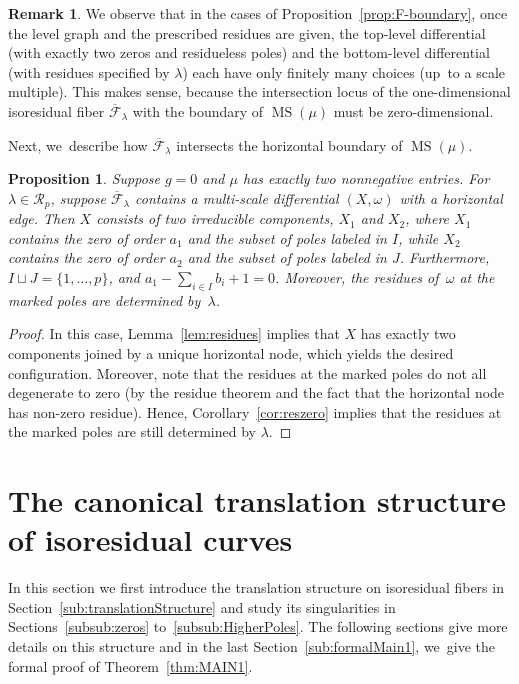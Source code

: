 \documentclass[11pt]{article}
\DeclareMathOperator\MS{MS}
\newtheorem{prop}[thm]{Proposition}
\theoremstyle{definition}
\newtheorem{rmk}[thm]{Remark}
\begin{document}
\begin{rmk}
We observe that in the cases of Proposition~\ref{prop:F-boundary}, once the level graph and the prescribed residues are given, the top-level differential (with exactly two zeros and residueless poles) and the bottom-level differential (with residues specified by $\lambda$) each have only finitely many choices (up~to a scale multiple). This makes sense, because the intersection locus of the one-dimensional isoresidual fiber $\overline{\mathcal F}_\lambda$ with the boundary of $\MS(\mu)$ must be zero-dimensional.
\end{rmk}

Next, we~describe how $\overline{\mathcal F}_\lambda$ intersects the horizontal boundary of $\MS(\mu)$.

\begin{prop}\label{prop:F-horizontal}
Suppose $g=0$ and $\mu$ has exactly two nonnegative entries.
For $\lambda \in \mathcal{R}_{p}$,
suppose $\overline{\mathcal F}_\lambda$ contains a multi-scale differential $(X,\omega)$ with a horizontal edge. Then $X$ consists of two irreducible components, $X_1$ and $X_2$, where $X_1$ contains the zero of order $a_1$ and the subset of poles labeled in $I$, while $X_2$ contains the zero of order $a_2$ and the subset of poles labeled in $J$. Furthermore, $I\sqcup J = \{1,\ldots,p\}$, and $a_1 - \sum_{i \in I} b_i + 1 = 0$. Moreover, the residues of~$\omega$ at the marked poles are determined by~$\lambda$.
\end{prop}

\begin{proof}
In this case, Lemma~\ref{lem:residues} implies that $X$ has exactly two components joined by a unique horizontal node, which yields the desired configuration. Moreover, note that the residues at the marked poles do not all degenerate to zero (by the residue theorem and the fact that the horizontal node has non-zero residue). Hence, Corollary~\ref{cor:reszero} implies that the residues at the marked poles are still determined by $\lambda$.
\end{proof}

\section{The canonical translation structure of isoresidual curves}\label{sec:Translation}

In this section we first introduce the translation structure on isoresidual fibers in Section~\ref{sub:translationStructure} and study its singularities in Sections~\ref{subsub:zeros} to~\ref{subsub:HigherPoles}. The following sections give more details on this structure and in the last Section~\ref{sub:formalMain1}, we~give the formal proof of Theorem~\ref{thm:MAIN1}.
\end{document}
